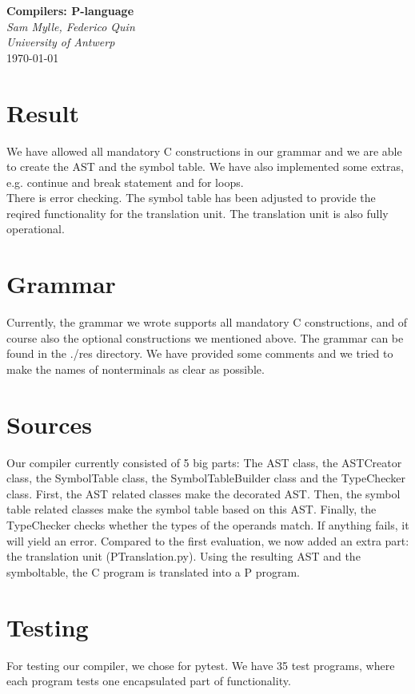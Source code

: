 \documentclass{article}
\begin{document}
\begin{titlepage}
   \begin{center}
      \Large\textbf{Compilers: P-language}\\
      \large\textit{Sam Mylle, Federico Quin \\ University of Antwerp} \\
      \today
   \end{center}
\end{titlepage}

\section{Result}
We have allowed all mandatory C constructions in our grammar and we are able to create the AST and the symbol table. We have also implemented some extras, e.g. continue and break statement and for loops. \\
There is error checking. The symbol table has been adjusted to provide the reqired functionality for the translation unit. The translation unit is also fully operational.

\section{Grammar}
Currently, the grammar we wrote supports all mandatory C constructions, and of course also the optional constructions we mentioned above. The grammar can be found in the ./res directory. We have provided some comments and we tried to make the names of nonterminals as clear as possible.

\section{Sources}
Our compiler currently consisted of 5 big parts: The AST class, the ASTCreator class, the SymbolTable class, the SymbolTableBuilder class and the TypeChecker class.
First, the AST related classes make the decorated AST. Then, the symbol table related classes make the symbol table based on this AST. Finally, the TypeChecker checks whether the types of the operands match. If anything fails, it will yield an error.
Compared to the first evaluation, we now added an extra part: the translation unit (PTranslation.py). Using the resulting AST and the symboltable, the C program is translated into a P program.

\section{Testing}
For testing our compiler, we chose for pytest. We have 35 test programs, where each program tests one encapsulated part of functionality.
\end{document}
